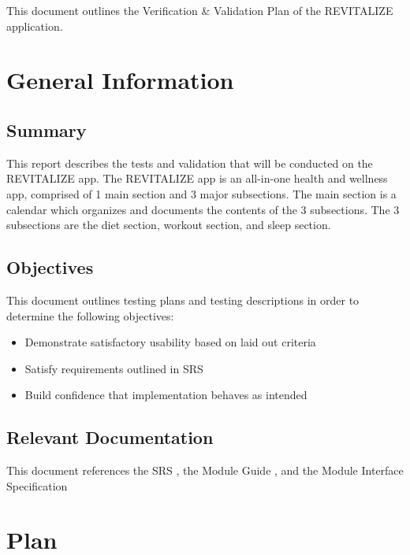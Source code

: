 \documentclass[12pt, titlepage]{article}
\begin{document}

\newpage


\noindent This document outlines the Verification \& Validation Plan of the REVITALIZE application.

\section{General Information}

\subsection{Summary}

\noindent This report describes the tests and validation that will be conducted on the REVITALIZE app. The REVITALIZE app is an all-in-one health and wellness app, comprised of 1 main section and 3 major subsections. The main section is a calendar which organizes and documents the contents of the 3 subsections. The 3 subsections are the diet section, workout section, and sleep section.

\subsection{Objectives}

\noindent This document outlines testing plans and testing descriptions in order to determine the following objectives: 
\begin{itemize}
	\item Demonstrate satisfactory usability based on laid out criteria
	\item Satisfy requirements outlined in SRS
	\item Build confidence that implementation behaves as intended
\end{itemize}
 

\subsection{Relevant Documentation}

\noindent This document references the SRS \citet{SRS}, the Module Guide \citet{MG}, and the Module Interface Specification \citet{MIS}


\section{Plan}
\end{document}
